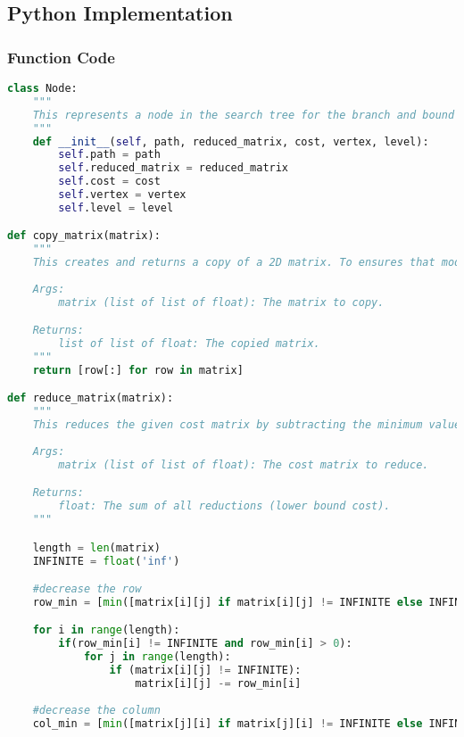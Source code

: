 \documentclass{article}
\begin{document}
\subsection*{Python Implementation}
\subsubsection*{Function Code}
\begin{lstlisting}[language=Python]
class Node:
    """
    This represents a node in the search tree for the branch and bound TSP algorithm. It stores the current path, reduced cost matrix, total cost, current vertex, and level in the tree.
    """
    def __init__(self, path, reduced_matrix, cost, vertex, level):
        self.path = path
        self.reduced_matrix = reduced_matrix
        self.cost = cost
        self.vertex = vertex
        self.level = level

def copy_matrix(matrix):
    """
    This creates and returns a copy of a 2D matrix. To ensures that modifications to the new matrix do not affect the original.
    
    Args:
        matrix (list of list of float): The matrix to copy.

    Returns:
        list of list of float: The copied matrix.
    """
    return [row[:] for row in matrix]

def reduce_matrix(matrix):
    """
    This reduces the given cost matrix by subtracting the minimum value from each row and column and returns the total reduction cost, which is used as a lower bound in the branch and bound algorithm.
    
    Args:
        matrix (list of list of float): The cost matrix to reduce.

    Returns:
        float: The sum of all reductions (lower bound cost).
    """

    length = len(matrix)
    INFINITE = float('inf')

    #decrease the row
    row_min = [min([matrix[i][j] if matrix[i][j] != INFINITE else INFINITE for j in range(length)]) for i in range(length)]

    for i in range(length):
        if(row_min[i] != INFINITE and row_min[i] > 0):
            for j in range(length):
                if (matrix[i][j] != INFINITE):
                    matrix[i][j] -= row_min[i]
    
    #decrease the column
    col_min = [min([matrix[j][i] if matrix[j][i] != INFINITE else INFINITE for j in range(length)]) for i in range(length)]


\end{lstlisting}
\end{document}
